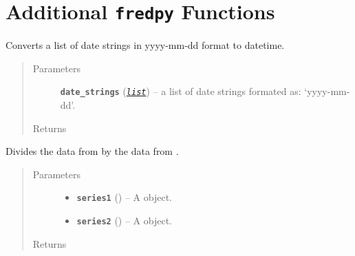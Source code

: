 \documentclass[letterpaper,10pt,openany,oneside]{sphinxmanual}
\begin{document}
\section{Additional \texttt{fredpy} Functions}
\label{additional_functions:additional-fredpy-functions}\label{additional_functions::doc}

\begin{fulllineitems}
\label{additional_functions:fredpy.date_times}
Converts a list of date strings in yyyy-mm-dd format to datetime.
\begin{quote}\begin{description}
\item[{Parameters}] \leavevmode
\textbf{\texttt{date\_strings}} (\href{https://docs.python.org/library/functions.html\#list}{\emph{\texttt{list}}}) -- a list of date strings formated as: `yyyy-mm-dd'.

\item[{Returns}] \leavevmode
{}

\end{description}\end{quote}

\end{fulllineitems}


\begin{fulllineitems}
\label{additional_functions:fredpy.divide}
Divides the data from  by the data from .
\begin{quote}\begin{description}
\item[{Parameters}] \leavevmode\begin{itemize}
\item {} 
\textbf{\texttt{series1}} ({\hyperref[series_class:fredpy.series]{}}) -- A  object.

\item {} 
\textbf{\texttt{series2}} ({\hyperref[series_class:fredpy.series]{}}) -- A  object.

\end{itemize}

\item[{Returns}] \leavevmode
{\hyperref[series_class:fredpy.series]{}}

\end{description}\end{quote}

\end{fulllineitems}
\end{document}
